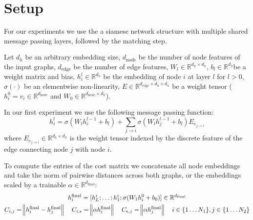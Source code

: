 \section{Setup}


For our experiments we use the a siamese network structure with multiple shared message passing layers, followed by the matching step.


Let $d_h$ be an arbitrary embedding size, $d_{\text{node}}$ be the number of node features of the input graphs, $d_{\text{edge}}$ be the number of edge features, $W_l \in \mathbb{R}^{d_h \times d_h}$, $b_l \in   \mathbb{R}^{d_h}$be a weight matrix and bias, $h_i^l \in \mathbb{R}^{d_h}$ be the embedding of node $i$ at layer $l$ for $l > 0$, $\sigma(\cdot)$ be an elementwise non-linearity, $E \in \mathbb{R}^{d_{\text{edge}} \times d_h \times d_h}$ be a weight tensor ($h_i^0 = v_i \in \mathbb{R}^{d_{\text{node}}}$ and $W_0 \in \mathbb{R}^{d_{\text{node}} \times d_h}$).

In our first experiment we use the following message passing function:
\begin{equation}
     h_i^{l} = \sigma(W_{l} h_i^{l-1} + b_l) + \sum_{j \rightarrow i} \sigma(W_{l} h_j^{l-1} + b_l) E_{e_{j \rightarrow i}}
\end{equation}
where $E_{e_{j \rightarrow i}} \in \mathbb{R}^{d_h \times d_h}$ is the weight tensor indexed by the discrete feature of the edge connecting node $j$ with node $i$.

To compute the entries of the cost matrix we concatenate all node embeddings and take the norm of pairwise distances across both graphs, or the embeddings scaled by a trainable $\alpha \in \mathbb{R}^{d_\text{final}}$:
\begin{equation}
     \begin{gathered}
          h_i^\text{final} = [h_L^i ; \dots ; h_1^i ; \sigma(W_{1} h_i^{0} + b_0)] \in \mathbb{R}^{d_\text{final}}\\
          C_{i,j} = \norm{h_i^\text{final} - h_j^\text{final}} \quad
          C_{i, \epsilon} = \norm{ \alpha h_i^\text{final}} \quad
          C_{\epsilon, j} = \norm{ \alpha h_j^\text{final}} \quad i \in \{1 \dots N_1\}, j \in \{1 \dots N_2\}
     \end{gathered}
\end{equation}

